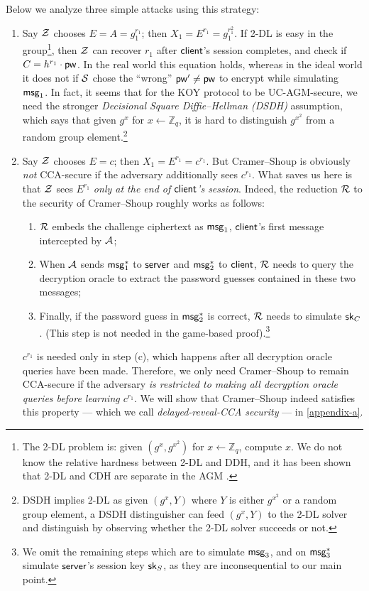 Below we analyze three simple attacks using this strategy:
\begin{enumerate}
	\item Say $\mathcal{Z}$ chooses $E = A = g_1^{r_1}$; then $X_1 = E^{r_1} = g_1^{r_1^2}$. If 2-DL is easy in the group\footnote{The 2-DL problem is: given $(g^x,g^{x^2})$ for $x \gets \mathbb{Z}_q$, compute $x$. We do not know the relative hardness between 2-DL and DDH, and it has been shown that 2-DL and CDH are separate in the AGM \cite{C:BauFucLos20}.}, then $\mathcal{Z}$ can recover $r_1$ after $\mathsf{client}$'s session completes, and check if $C = h^{r_1} \cdot \mathsf{pw}$. In the real world this equation holds, whereas in the ideal world it does not if $\mathcal{S}$ chose the ``wrong'' $\mathsf{pw}' \neq \mathsf{pw}$ to encrypt while simulating $\mathsf{msg}_{1}$. In fact, it seems that for the KOY protocol to be UC-AGM-secure, we need the stronger \emph{Decisional Square Diffie--Hellman (DSDH)} assumption, which says that given $g^x$ for $x \gets \mathbb{Z}_q$, it is hard to distinguish $g^{x^2}$ from a random group element.\footnote{DSDH implies 2-DL as given $(g^x,Y)$ where $Y$ is either $g^{x^2}$ or a random group element, a DSDH distinguisher can feed $(g^x,Y)$ to the 2-DL solver and distinguish by observing whether the 2-DL solver succeeds or not.}
	\item Say $\mathcal{Z}$ chooses $E = c$; then $X_1 = E^{r_1} = c^{r_1}$. But Cramer--Shoup is obviously \emph{not} CCA-secure if the adversary additionally sees $c^{r_1}$. What saves us here is that $\mathcal{Z}$ sees $E^{r_1}$ \emph{only at the end of $\mathsf{client}$'s session}. Indeed, the reduction $\mathcal{R}$ to the security of Cramer--Shoup roughly works as follows:
	\begin{enumerate}
		\item $\mathcal{R}$ embeds the challenge ciphertext as $\mathsf{msg}_{1}$, $\mathsf{client}$'s first message intercepted by $\mathcal{A}$;
		\item When $\mathcal{A}$ sends $\mathsf{msg}_{1}^*$ to $\mathsf{server}$ and $\mathsf{msg}_{2}^*$ to $\mathsf{client}$, $\mathcal{R}$ needs to query the decryption oracle to extract the password guesses contained in these two messages;
		\item Finally, if the password guess in $\mathsf{msg}_{2}^*$ is correct, $\mathcal{R}$ needs to simulate $\mathsf{sk}_C$. (This step is not needed in the game-based proof).\footnote{We omit the remaining steps which are to simulate $\mathsf{msg}_{3}$, and on $\mathsf{msg}_{3}^*$ simulate $\mathsf{server}$'s session key $\mathsf{sk}_S$, as they are inconsequential to our main point.}
	\end{enumerate}
	$c^{r_1}$ is needed only in step (c), which happens after all decryption oracle queries have been made. Therefore, we only need Cramer--Shoup to remain CCA-secure if the adversary \emph{is restricted to making all decryption oracle queries before learning $c^{r_1}$}. We will show that Cramer--Shoup indeed satisfies this property --- which we call \emph{delayed-reveal-CCA security} --- in \cref{appendix-a}.

\end{enumerate}
